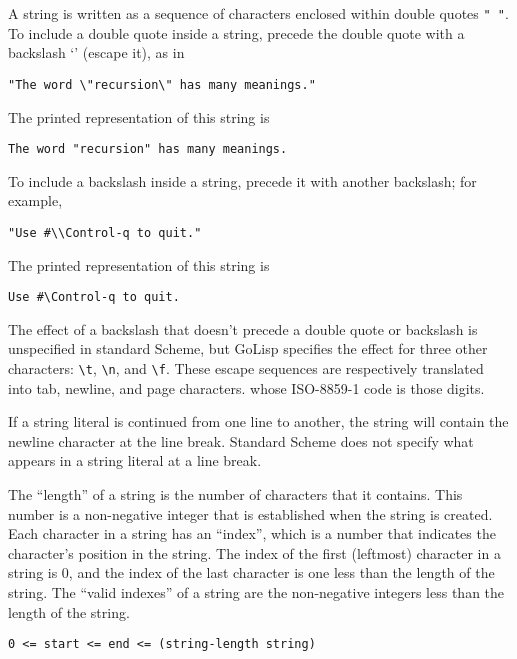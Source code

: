 \documentclass{article}
\begin{document}
A string is written as a sequence of characters enclosed within double quotes \verb|" "|. To
include a double quote inside a string, precede the double quote with a backslash `' (escape
it), as in

\begin{verbatim}
"The word \"recursion\" has many meanings."
\end{verbatim}

The printed representation of this string is

\begin{verbatim}
The word "recursion" has many meanings.
\end{verbatim}

To include a backslash inside a string, precede it with another
backslash; for example,

\begin{verbatim}
"Use #\\Control-q to quit."
\end{verbatim}

The printed representation of this string is

\begin{verbatim}
Use #\Control-q to quit.
\end{verbatim}

The effect of a backslash that doesn't precede a double quote or backslash is unspecified in
standard Scheme, but GoLisp specifies the effect for three other characters:
\verb|\t|, \verb|\n|, and \verb|\f|. These
escape sequences are respectively translated into tab, newline, and page characters. whose
ISO-8859-1 code is those digits.

If a string literal is continued from one line to another, the string will contain the newline
character at the line break. Standard Scheme does not
specify what appears in a string literal at a line break.

The ``length'' of a string is the number of characters that it contains. This number is a
non-negative integer that is established when the string is created. Each character in a
string has an ``index'', which is a number that indicates the character's position in the
string. The index of the first (leftmost) character in a string is 0, and the index of the
last character is one less than the length of the string. The ``valid indexes'' of a string
are the non-negative integers less than the length of the string.

\begin{verbatim}0 <= start <= end <= (string-length string)
\end{verbatim}
\end{document}
